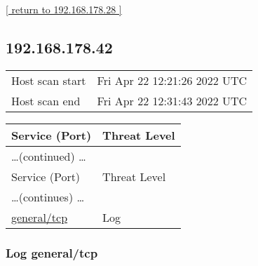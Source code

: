 \documentclass{article}
\begin{document}
\begin{footnotesize}\hyperref[host:192.168.178.28]{[ return to 192.168.178.28 ]}\end{footnotesize}
\subsection{192.168.178.42}
\label{host:192.168.178.42}

\begin{tabular}{ll}
Host scan start&Fri Apr 22 12:21:26 2022 UTC\\
Host scan end&Fri Apr 22 12:31:43 2022 UTC\\
\end{tabular}

\begin{longtable}{|l|l|}
\hline
\rowcolor{gvm_report}Service (Port)&Threat Level\\
\hline
\endfirsthead
\multicolumn{2}{l}{\hfill\ldots (continued) \ldots}\\
\hline
\rowcolor{gvm_report}Service (Port)&Threat Level\\
\hline
\endhead
\hline
\multicolumn{2}{l}{\ldots (continues) \ldots}\\
\endfoot
\hline
\endlastfoot
\hline
\hyperref[port:192.168.178.42 general/tcp Log]{general/tcp}&Log\\
\hline
\end{longtable}



\subsubsection{Log general/tcp}
\label{port:192.168.178.42 general/tcp Log}
\end{document}

